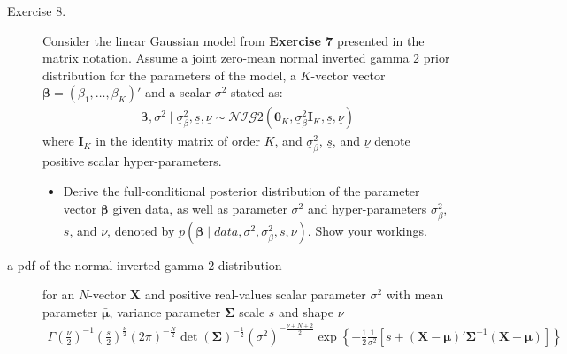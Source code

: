 \documentclass[12pt]{article}
\begin{document}
\begin{adjustwidth}{1cm}{1cm}
\begin{description}
\bigskip\item[Exercise 8.] Consider the linear Gaussian model from \textbf{Exercise 7} presented in the matrix notation. Assume a joint zero-mean normal inverted gamma 2 prior distribution for the parameters of the model, a $K$-vector vector $\boldsymbol\beta = (\beta_1,\dots, \beta_K)'$ and a scalar $\sigma^2$ stated as:
\begin{align}
\boldsymbol\beta, \sigma^2 \mid \underline{\sigma}_\beta^2, \underline{s}, \underline{\nu} \sim\mathcal{NIG}2\left(\mathbf{0}_K, \underline{\sigma}_\beta^2 \mathbf{I}_K, \underline{s}, \underline{\nu} \right)
\end{align}
where $\mathbf{I}_K$ in the identity matrix of order $K$, and  $\underline{\sigma}_\beta^2$, $\underline{s}$, and $\underline{\nu}$ denote positive scalar hyper-parameters.
\begin{itemize}
\item Derive the full-conditional posterior distribution of the parameter vector $\boldsymbol\beta$ given data, as well as parameter $\sigma^2$ and hyper-parameters $\underline{\sigma}^2_\beta$, $\underline{s}$, and $\underline{\nu}$, denoted by $p\left(\boldsymbol\beta\mid data, \sigma^2, \underline{\sigma}^2_\beta, \underline{s}, \underline{\nu}\right)$. Show your workings.
\end{itemize}
\item[a pdf of the normal inverted gamma 2 distribution] for an $N$-vector $\mathbf{X}$ and positive real-values scalar parameter $\sigma^2$ with mean parameter $\bar{\boldsymbol\mu}$, variance parameter $\mathbf\Sigma$ scale $s$ and shape $\nu$
\begin{align}
\Gamma\left(\frac{\nu}{2}\right)^{-1}\left(\frac{s}{2}\right)^{\frac{\nu}{2}}(2\pi)^{-\frac{N}{2}}\det(\mathbf\Sigma)^{-\frac{1}{2}}\left(\sigma^2\right)^{-\frac{\nu+N+2}{2}}\exp\left\{ -\frac{1}{2}\frac{1}{\sigma^2}\left[ s+(\mathbf{X}-\boldsymbol\mu)'\mathbf\Sigma^{-1}(\mathbf{X}-\boldsymbol\mu) \right]\right\}
\end{align}



\end{description}
\end{adjustwidth}
\end{document}
